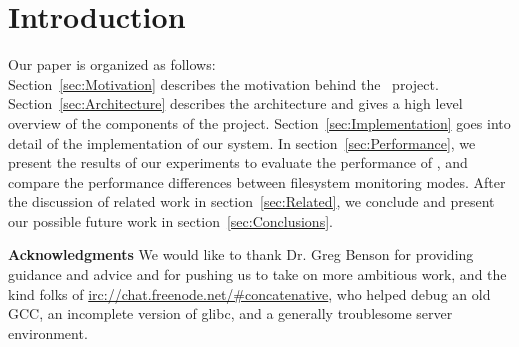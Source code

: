 \section{Introduction}
\label{sec:Introduction}


Our paper is organized as follows:\\
Section~\ref{sec:Motivation} describes the motivation behind the \teledroid\ project.
Section~\ref{sec:Architecture} describes the architecture and gives a high level overview of the components of the project.
Section~\ref{sec:Implementation} goes into detail of the implementation of our system.
In section~\ref{sec:Performance}, we present the results of our experiments to evaluate the performance of \teledroid, and compare the performance differences between filesystem monitoring modes.
After the discussion of related work in section~\ref{sec:Related}, we conclude and present our possible future work 
in section~\ref{sec:Conclusions}.

{\bf Acknowledgments}  We would like to thank Dr. Greg Benson for providing guidance and advice and for pushing us to 
take on more ambitious work, and the kind folks of \url{irc://chat.freenode.net/#concatenative}, who helped debug an old 
GCC, an incomplete version of glibc, and a generally troublesome server environment.